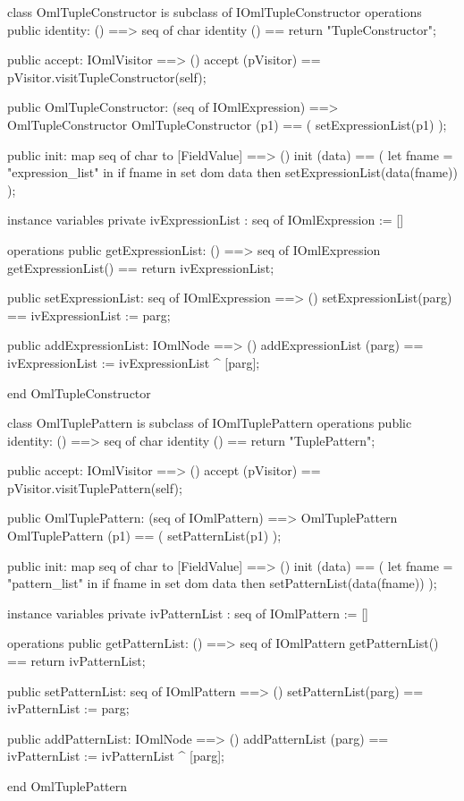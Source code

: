 \begin{vdm_al}
class OmlTupleConstructor is subclass of IOmlTupleConstructor
operations
  public identity: () ==> seq of char
  identity () == return "TupleConstructor";

  public accept: IOmlVisitor ==> ()
  accept (pVisitor) == pVisitor.visitTupleConstructor(self);

  public OmlTupleConstructor:
      (seq of IOmlExpression) ==> OmlTupleConstructor
  OmlTupleConstructor (p1) == 
   ( setExpressionList(p1) );

  public init: map seq of char to [FieldValue] ==> ()
  init (data) ==
    ( let fname = "expression_list" in
        if fname in set dom data
        then setExpressionList(data(fname)) );

instance variables
  private ivExpressionList : seq of IOmlExpression := []

operations
  public getExpressionList: () ==> seq of IOmlExpression
  getExpressionList() == return ivExpressionList;

  public setExpressionList: seq of IOmlExpression ==> ()
  setExpressionList(parg) == ivExpressionList := parg;

  public addExpressionList: IOmlNode ==> ()
  addExpressionList (parg) == ivExpressionList := ivExpressionList ^ [parg];

end OmlTupleConstructor
\end{vdm_al}

\begin{vdm_al}
class OmlTuplePattern is subclass of IOmlTuplePattern
operations
  public identity: () ==> seq of char
  identity () == return "TuplePattern";

  public accept: IOmlVisitor ==> ()
  accept (pVisitor) == pVisitor.visitTuplePattern(self);

  public OmlTuplePattern:
      (seq of IOmlPattern) ==> OmlTuplePattern
  OmlTuplePattern (p1) == 
   ( setPatternList(p1) );

  public init: map seq of char to [FieldValue] ==> ()
  init (data) ==
    ( let fname = "pattern_list" in
        if fname in set dom data
        then setPatternList(data(fname)) );

instance variables
  private ivPatternList : seq of IOmlPattern := []

operations
  public getPatternList: () ==> seq of IOmlPattern
  getPatternList() == return ivPatternList;

  public setPatternList: seq of IOmlPattern ==> ()
  setPatternList(parg) == ivPatternList := parg;

  public addPatternList: IOmlNode ==> ()
  addPatternList (parg) == ivPatternList := ivPatternList ^ [parg];

end OmlTuplePattern
\end{vdm_al}

